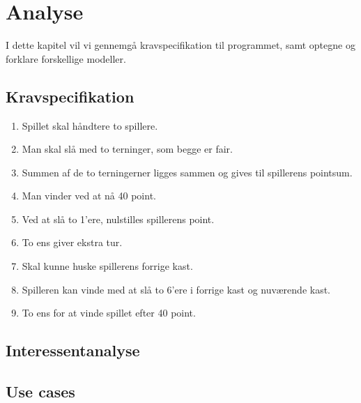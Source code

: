 \chapter{Analyse}

I dette kapitel vil vi gennemgå kravspecifikation til programmet, samt optegne og forklare forskellige modeller.


\section{Kravspecifikation}

\begin{enumerate}
    \item Spillet skal håndtere to spillere.
    \item Man skal slå med to terninger, som begge er fair.
    \item Summen af de to terningerner ligges sammen og gives til spillerens pointsum.
    \item Man vinder ved at nå 40 point.
    \item Ved at slå to 1'ere, nulstilles spillerens point.
    \item To ens giver ekstra tur.
    \item Skal kunne huske spillerens forrige kast.
    \item Spilleren kan vinde med at slå to 6'ere i forrige kast og nuværende kast.
    \item To ens for at vinde spillet efter 40 point.
\end{enumerate}

\section{Interessentanalyse}

\section{Use cases}
